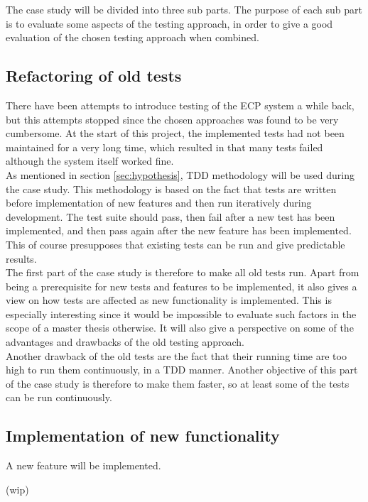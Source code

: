 
The case study will be divided into three sub parts. The purpose of each
sub part is to evaluate some aspects of the testing approach, in order
to give a good evaluation of the chosen testing approach when
combined.\\


\subsection{Refactoring of old tests}

There have been attempts to introduce testing of the ECP system a while
back, but this attempts stopped since the chosen approaches was found to
be very cumbersome. At the start of this project, the implemented tests
had not been maintained for a very long time, which resulted in that
many tests failed although the system itself worked fine.\\

As mentioned in section \ref{sec:hypothesis}, TDD methodology will be
used during the case study. This methodology is based on the fact that
tests are written before implementation of new features and then run
iteratively during development. The test suite should pass, then fail
after a new test has been implemented, and then pass again after the new
feature has been implemented. This of course presupposes that existing
tests can be run and give predictable results.\\

The first part of the case study is therefore to make all old tests run.
Apart from being a prerequisite for new tests and features to be
implemented, it also gives a view on how tests are affected as new
functionality is implemented. This is especially interesting since it
would be impossible to evaluate such factors in the scope of a master
thesis otherwise. It will also give a perspective on some of the
advantages and drawbacks of the old testing approach.\\

Another drawback of the old tests are the fact that their running time
are too high to run them continuously, in a TDD manner. Another
objective of this part of the case study is therefore to make them
faster, so at least some of the tests can be run continuously.\\


\subsection{Implementation of new functionality}

A new feature will be implemented.

(wip)
